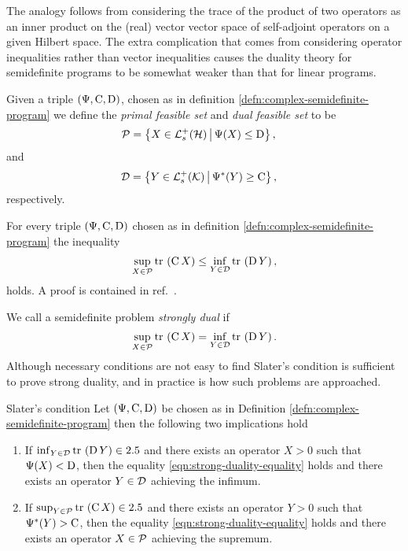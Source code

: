 The analogy follows from considering the trace of the product of two operators as an inner product on the (real) vector vector space of self-adjoint operators on a given Hilbert space. The extra complication that comes from considering operator inequalities rather than vector inequalities causes the duality theory for semidefinite programs to be somewhat weaker than that for linear programs.

\begin{defn}\label{defn:semidefinite-feasible-sets}
  Given a triple $\left(\Psi, \operatorname{C}, \operatorname{D}\right)$, chosen as in definition \ref{defn:complex-semidefinite-program} we define the \emph{primal feasible set} and \emph{dual feasible set} to be
  \begin{align}
    \pcal &= \sbuild{X\in\posops[\hcal]}{\Psi(X)\leq \opd},
  \end{align}
  and
  \begin{align}
    \dcal &= \sbuild{Y\in\posops[\kcal]}{\Psi^*(Y)\geq \opc},
  \end{align}
  respectively.
\end{defn}

\begin{thm}\label{thm:weak-duality-semidefinite-prog}
  For every triple $\left(\Psi, \operatorname{C}, \operatorname{D}\right)$ chosen as in definition \ref{defn:complex-semidefinite-program} the inequality
  \begin{align}
    \sup_{X\in\pcal} \tr{\opc X} \leq \inf_{Y\in\dcal} \tr{\opd Y},
  \end{align}
  holds. A proof is contained in ref.~\cite{Vandenberghe-Boyd-semidefinite}.
\end{thm}

We call a semidefinite problem \emph{strongly dual} if
\begin{align}\label{eqn:strong-duality-equality}
  \sup_{X\in\pcal} \tr{\opc X} = \inf_{Y\in\dcal} \tr{\opd Y}.
\end{align}
Although necessary conditions are not easy to find Slater's condition \cite{slater1950} is sufficient to prove strong duality, and in practice is how such problems are approached.
\begin{thm}{Slater's condition}\label{eqn:slaters-condition-sufficient}
  Let $\left(\Psi, \operatorname{C}, \operatorname{D}\right)$ be chosen as in Definition \ref{defn:complex-semidefinite-program} then the following two implications hold
  \begin{enumerate}
  \item If $\inf_{Y\in\dcal} \tr{\opd Y} \in\R$ and there exists an operator $X> 0$ such that $\Psi(X) < \operatorname{D}$, then the equality \eqref{eqn:strong-duality-equality} holds and there exists an operator $Y\in\mathcal{D}$ achieving the infimum.
  \item If $\sup_{Y\in\pcal} \tr{\opc X} \in\R$ and there exists an operator $Y> 0$ such that $\Psi^*(Y) > \operatorname{C}$, then the equality \eqref{eqn:strong-duality-equality} holds and there exists an operator $X\in\mathcal{P}$ achieving the supremum.
  \end{enumerate}
\end{thm}

